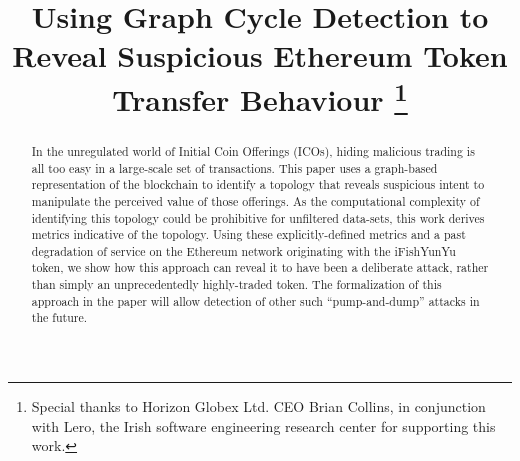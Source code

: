 \documentclass[conference]{IEEEtran}
\begin{document}
\title{Using Graph Cycle Detection to Reveal Suspicious Ethereum Token Transfer Behaviour
\thanks{Special thanks to Horizon Globex Ltd. CEO Brian Collins, in conjunction with Lero, the Irish software engineering research center for supporting this work.}
}

\author{
\and
{}
\and
{}
\and
{}
\and 
{}
}

\maketitle

\begin{abstract}
In the unregulated world of Initial Coin Offerings (ICOs),  hiding malicious trading is all too easy in a large-scale set of transactions.  This paper uses a graph-based representation of the blockchain to identify a topology that reveals suspicious intent to manipulate the perceived value of those offerings. As the computational complexity of identifying this topology could be prohibitive for unfiltered data-sets, this work derives metrics indicative of the topology. Using these explicitly-defined metrics and a past degradation of service on the Ethereum network originating with the iFishYunYu token, we show how this approach can reveal it to have been a deliberate attack, rather than simply an unprecedentedly highly-traded token. The formalization of this approach in the paper will allow detection of other such ``pump-and-dump'' attacks in the future.
\end{abstract}
\end{document}
